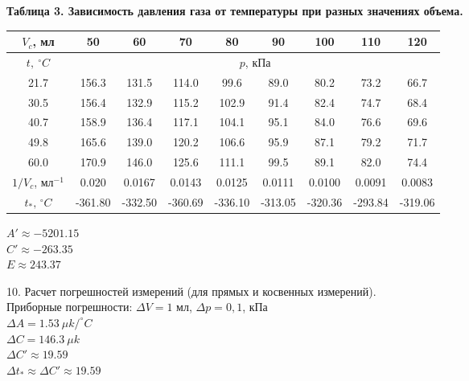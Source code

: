 \documentclass[12pt]{article}
\begin{document}
\begin{flushleft}
    \newpage
    \begin{center}
        \textbf{Таблица 3. Зависимость давления газа от температуры при разных значениях объема.} \\
    \end{center}
    \begin{table}[h]
        \centering
        \begin{tabular}{|c|c|c|c|c|c|c|c|c|}
        \hline
        $ V_c $, мл & 50 & 60 & 70 & 80 & 90 & 100 & 110 & 120 \\
        \hline
        $ t, \ ^\circ C $ & \multicolumn{8}{c|}{$p$, кПа} \\
        \hline
        21.7 & 156.3 & 131.5 & 114.0 & 99.6  & 89.0  & 80.2  & 73.2  & 66.7 \\
        \hline
        30.5 & 156.4 & 132.9 & 115.2 & 102.9 & 91.4  & 82.4  & 74.7  & 68.4 \\
        \hline
        40.7 & 158.9 & 136.4 & 117.1 & 104.1 & 95.1  & 84.0  & 76.6  & 69.6 \\
        \hline
        49.8 & 165.6 & 139.0 & 120.2 & 106.6& 95.9 & 87.1 & 79.2 & 71.7 \\
        \hline
        60.0 & 170.9 & 146.0 & 125.6 & 111.1& 99.5 & 89.1 & 82.0 & 74.4 \\
        \hline
        $ 1/V_c$, мл$^{-1}$ & 0.020 & 0.0167 & 0.0143 & 0.0125 & 0.0111 & 0.0100 & 0.0091 & 0.0083 \\
        \hline
        $ t_{*}, \, ^\circ C $ & -361.80 & -332.50 & -360.69 & -336.10 & -313.05 & -320.36 & -293.84 & -319.06 \\
        \hline
        \end{tabular}
    \end{table}

    $ A' \approx -5201.15 $ \\
    $ C' \approx -263.35 $ \\
    $ E \approx 243.37 $ \\
\end{flushleft}

\begin{flushleft}
    10. Расчет погрешностей измерений (для прямых и косвенных измерений). \\
    Приборные погрешности: $ \Delta V = 1$ мл, $\Delta p = 0,1 $, кПа \\
    $ \Delta A = 1.53 \ \mu k/^\circ C $ \\
    $ \Delta C = 146.3 \ \mu k $ \\
    $ \Delta C' \approx 19.59 $ \\
    $ \Delta t_* \approx \Delta C' \approx 19.59 $ \\
\end{flushleft}
\end{document}
